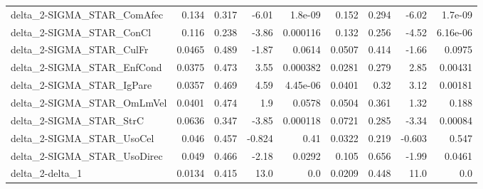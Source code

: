 \begin{tabular}{lrrrrrrrr}
delta\_2-SIGMA\_STAR\_ComAfec             &       0.134 &        0.317 &    -6.01 &  1.8e-09 &      0.152 &       0.294 &        -6.02 &       1.7e-09 \\
delta\_2-SIGMA\_STAR\_ConCl               &       0.116 &        0.238 &    -3.86 & 0.000116 &      0.132 &       0.256 &        -4.52 &      6.16e-06 \\
delta\_2-SIGMA\_STAR\_CulFr               &      0.0465 &        0.489 &    -1.87 &   0.0614 &     0.0507 &       0.414 &        -1.66 &        0.0975 \\
delta\_2-SIGMA\_STAR\_EnfCond             &      0.0375 &        0.473 &     3.55 & 0.000382 &     0.0281 &       0.279 &         2.85 &       0.00431 \\
delta\_2-SIGMA\_STAR\_IgPare              &      0.0357 &        0.469 &     4.59 & 4.45e-06 &     0.0401 &        0.32 &         3.12 &       0.00181 \\
delta\_2-SIGMA\_STAR\_OmLmVel             &      0.0401 &        0.474 &      1.9 &   0.0578 &     0.0504 &       0.361 &         1.32 &         0.188 \\
delta\_2-SIGMA\_STAR\_StrC                &      0.0636 &        0.347 &    -3.85 & 0.000118 &     0.0721 &       0.285 &        -3.34 &       0.00084 \\
delta\_2-SIGMA\_STAR\_UsoCel              &       0.046 &        0.457 &   -0.824 &     0.41 &     0.0322 &       0.219 &       -0.603 &         0.547 \\
delta\_2-SIGMA\_STAR\_UsoDirec            &       0.049 &        0.466 &    -2.18 &   0.0292 &      0.105 &       0.656 &        -1.99 &        0.0461 \\
delta\_2-delta\_1                        &      0.0134 &        0.415 &     13.0 &      0.0 &     0.0209 &       0.448 &         11.0 &           0.0 \\
\bottomrule
\end{tabular}
